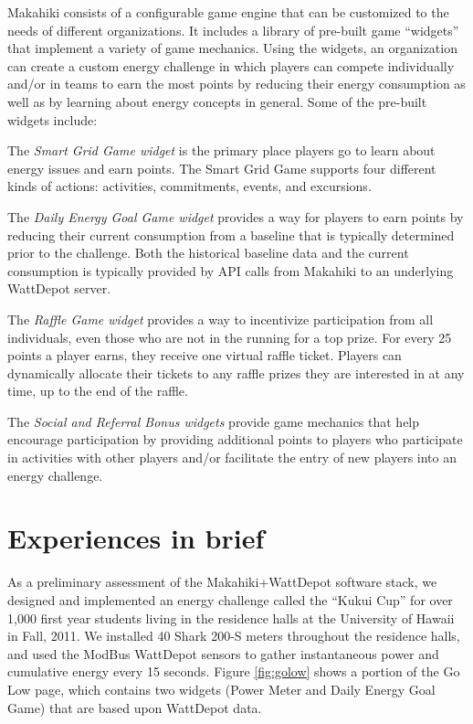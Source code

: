 \documentclass{acm_proc_article-sp}
\begin{document}
Makahiki consists of a configurable game engine that can be customized to the needs of
different organizations.  It includes a library of pre-built game ``widgets'' that
implement a variety of game mechanics.  Using the widgets, an organization can create a
custom energy challenge in which players can compete individually and/or in teams to earn
the most points by reducing their energy consumption as well as by learning about energy
concepts in general.  Some of the pre-built widgets include:

The {\em Smart Grid Game widget} is the primary place players go to learn about energy issues and earn
points.  The Smart Grid Game supports four different kinds of actions: activities,
commitments, events, and excursions. 

The {\em Daily Energy Goal Game widget} provides a way for players to earn points by reducing their
current consumption from a baseline that is typically determined prior to the challenge.
Both the historical baseline data and the current consumption is typically provided
by API calls from Makahiki to an underlying WattDepot server.


The {\em Raffle Game widget} provides a way to incentivize participation from all individuals, even
those who are not in the running for a top prize. For every 25 points a player earns, they
receive one virtual raffle ticket. Players can dynamically allocate their tickets to any
raffle prizes they are interested in at any time, up to the end of the raffle.

The {\em Social and Referral Bonus widgets} provide game mechanics that help encourage
participation by providing additional points to players who participate in activities with
other players and/or facilitate the entry of new players into an energy challenge. 

\section{Experiences in brief}

As a preliminary assessment of the Makahiki+WattDepot software stack, we designed and
implemented an energy challenge called the ``Ku\-kui Cup'' for over 1,000 first year
students living in the residence halls at the University of Hawaii in Fall, 2011.  We
installed 40 Shark 200-S meters throughout the residence halls, and used the ModBus
WattDepot sensors to gather instantaneous power and cumulative energy every 15 seconds.
Figure \ref{fig:golow} shows a portion of the Go Low page, which contains two widgets
(Power Meter and Daily Energy Goal Game) that are based upon WattDepot data.
\end{document}
